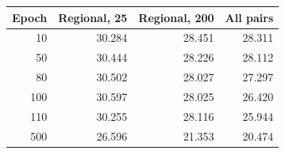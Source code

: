 \begin{tabular}{rrrr}
\toprule
Epoch & Regional, 25 & Regional, 200 & All pairs \\
\midrule
10 & 30.284 & 28.451 & 28.311 \\
50 & 30.444 & 28.226 & 28.112 \\
80 & 30.502 & 28.027 & 27.297 \\
100 & 30.597 & 28.025 & 26.420 \\
110 & 30.255 & 28.116 & 25.944 \\
500 & 26.596 & 21.353 & 20.474 \\
\bottomrule
\end{tabular}
